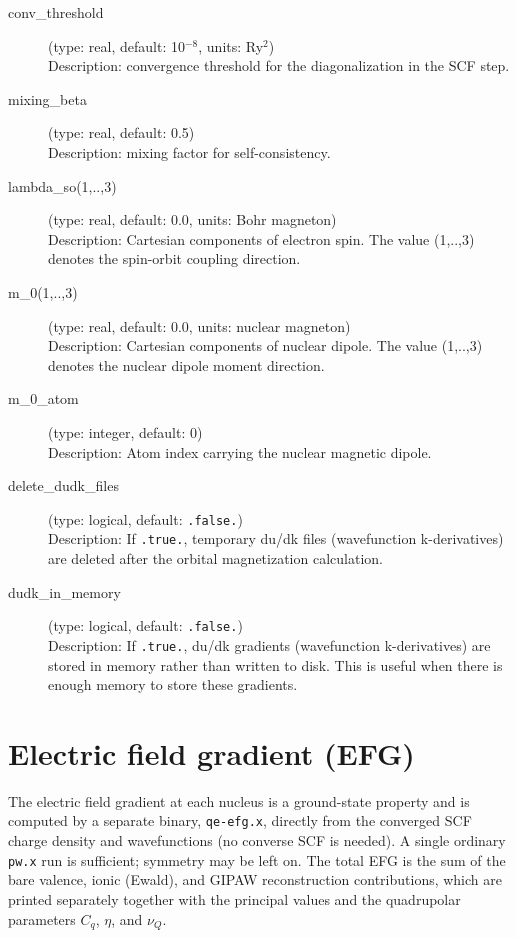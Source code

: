\documentclass[a4paper,11pt,twoside]{article}
\begin{document}
\begin{description}
\item[conv\_threshold] (type: real, default: 10$^{-8}$, units: Ry$^2$)\\
Description: convergence threshold for the diagonalization in the SCF step.

\item[mixing\_beta] (type: real, default: 0.5)\\
Description: mixing factor for self-consistency.

\item[lambda\_so(1,..,3)] (type: real, default: 0.0, units: Bohr magneton)\\
Description: Cartesian components of electron spin. The value (1,..,3) denotes the spin-orbit coupling direction.

\item[m\_0(1,..,3)] (type: real, default: 0.0, units: nuclear magneton)\\
Description: Cartesian components of nuclear dipole. The value (1,..,3) denotes the nuclear dipole moment direction.

\item[m\_0\_atom] (type: integer, default: 0)\\
Description: Atom index carrying the nuclear magnetic dipole.

\item[delete\_dudk\_files] (type: logical, default: \texttt{.false.})\\
Description: If \texttt{.true.}, temporary du/dk files (wavefunction k-derivatives) are deleted after the orbital magnetization calculation.

\item[dudk\_in\_memory] (type: logical, default: \texttt{.false.})\\
Description: If \texttt{.true.}, du/dk gradients (wavefunction k-derivatives) are stored in memory rather than written to disk. This is useful when there is enough memory to store these gradients.


\end{description}


\section{Electric field gradient (EFG)}
The electric field gradient at each nucleus is a ground-state property and is computed by a
separate binary, \texttt{qe-efg.x}, directly from the converged SCF charge density and
wavefunctions (no converse SCF is needed). A single ordinary \texttt{pw.x} run is sufficient;
symmetry may be left on. The total EFG is the sum of the bare valence, ionic (Ewald), and GIPAW
reconstruction contributions, which are printed separately together with the principal values and
the quadrupolar parameters $C_q$, $\eta$, and $\nu_Q$.
\end{document}
